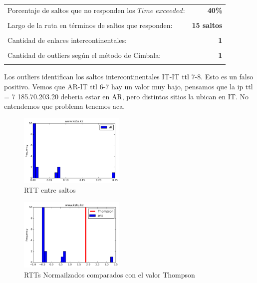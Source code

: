 \begin{center}
\begin{tabular}{p{6.5cm}r}
Porcentaje de saltos que no responden los $Time$ $exceeded$: & \textbf{40\%} \\ \\ 
Largo de la ruta en términos de saltos que responden: &\textbf{15 saltos} \\ \\
Cantidad de enlaces intercontinentales: & \textbf{1} \\ \\
Cantidad de outliers según el método de Cimbala: & \textbf{1} \\ \\
\end{tabular}
\end{center}

Los outliers identifican los saltos intercontinentales IT-IT ttl 7-8. Esto es un falso positivo. Vemos que AR-IT ttl 6-7 hay un valor muy bajo, pensamos que la ip ttl = 7 185.70.203.20 deberia estar en AR, pero distintos sitios la ubican en IT. No entendemos que problema tenemos aca.

\begin{figure}[H]
  \centering
    \includegraphics[width=0.45\textwidth]{histogramas_rtt/www-kstu-kz.png}
  \caption{RTT entre saltos}
  \label{entropia-s}
\end{figure}

\begin{center}
\end{center}


\begin{figure}[H]
  \centering
    \includegraphics[width=0.45\textwidth]{histogramas_thompson/www-kstu-kz.png}
  \caption{RTTs Normailzados comparados con el valor Thompson}
  \label{entropia-s}
\end{figure}

